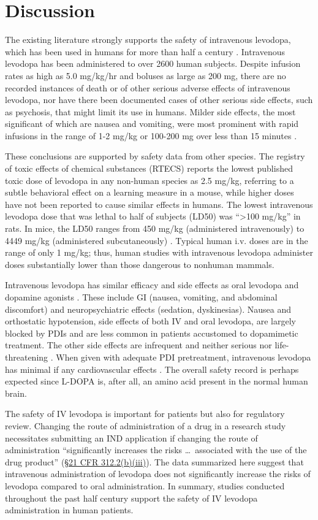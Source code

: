 \section{Discussion}
The existing literature strongly supports the safety of intravenous levodopa, which has been used in humans for more than half a century \cite{14430381}.  Intravenous levodopa has been administered to over 2600 human subjects.  Despite infusion rates as high as 5.0 mg/kg/hr and boluses as large as 200 mg, there are no recorded instances of death or of other serious adverse effects of intravenous levodopa, nor have there been documented cases of other serious side effects, such as psychosis, that might limit its use in humans. Milder side effects, the most significant of which are nausea and vomiting, were most prominent with rapid infusions in the range of 1-2 mg/kg or 100-200 mg over less than 15 minutes \cite{5327616,Bbrung_1966,12865145,4555619,6540399,4880674}. 

These conclusions are supported by safety data from other species. The registry of toxic effects of chemical substances (RTECS) reports the lowest published toxic dose of levodopa in any non-human species as 2.5 mg/kg, referring to a subtle behavioral effect on a learning measure in a mouse, while higher doses have not been reported to cause similar effects in humans.  The lowest intravenous levodopa dose that was lethal to half of subjects (LD50) was ``>100 mg/kg'' in rats.  In mice, the LD50 ranges from 450 mg/kg (administered intravenously) to 4449 mg/kg (administered subcutaneously) \cite{rtecs}.  Typical human i.v. doses are in the range of only 1 mg/kg; thus, human studies with intravenous levodopa administer doses substantially lower than those dangerous to nonhuman mammals. 

Intravenous levodopa has similar efficacy and side effects as oral levodopa \cite{Connolly_2014} and dopamine agonists \cite{Bonuccelli_2008}.  These include GI (nausea, vomiting, and abdominal discomfort) and neuropsychiatric effects (sedation, dyskinesias).  Nausea and orthostatic hypotension, side effects of both IV and oral levodopa, are largely blocked by PDIs and are less common in patients accustomed to dopamimetic treatment.  The other side effects are infrequent and neither serious nor life-threatening \cite{Connolly_2014}. When given with adequate PDI pretreatment, intravenous levodopa has minimal if any cardiovascular effects \cite{Siddiqi2015}. The overall safety record is perhaps expected since L-DOPA is, after all, an amino acid present in the normal human brain. 

The safety of IV levodopa is important for patients but also for regulatory review.  Changing the route of administration of a drug in a research study necessitates submitting an IND application if changing the route of administration “significantly increases the risks \dots\ associated with the use of the drug product” (\href{http://www.accessdata.fda.gov/scripts/cdrh/cfdocs/cfcfr/CFRSearch.cfm?fr=312.2}{\S 21 CFR 312.2(b)(iii)}).  The data summarized here suggest that intravenous administration of levodopa does not significantly increase the risks of levodopa compared to oral administration.  In summary, studies conducted throughout the past half century support the safety of IV levodopa administration in human patients.
  